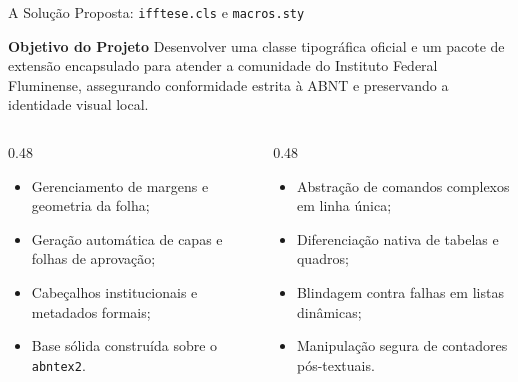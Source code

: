 \documentclass[aspectratio=169, 10pt]{beamer}
\begin{document}
\begin{frame}{A Solução Proposta: \texttt{ifftese.cls} e \texttt{macros.sty}}
  \begin{block}{\textbf{Objetivo do Projeto}}
    Desenvolver uma classe tipográfica oficial e um pacote de extensão encapsulado para atender a comunidade do Instituto Federal Fluminense, assegurando conformidade estrita à ABNT e preservando a identidade visual local.
  \end{block}

  \vspace{0.3cm}

  \begin{columns}[T]
    \begin{column}{0.48\textwidth}
      \begin{tcolorbox}[colback=white,colframe=iffgreen,title=\textbf{Classe \texttt{ifftese.cls}}]
        \small
        \begin{itemize}
          \item Gerenciamento de margens e geometria da folha;
          \item Geração automática de capas e folhas de aprovação;
          \item Cabeçalhos institucionais e metadados formais;
          \item Base sólida construída sobre o \texttt{abntex2}.
        \end{itemize}
      \end{tcolorbox}
    \end{column}

    \begin{column}{0.48\textwidth}
      \begin{tcolorbox}[colback=white,colframe=conepeteal,title=\textbf{Extensão \texttt{macros.sty}}]
        \small
        \begin{itemize}
          \item Abstração de comandos complexos em linha única;
          \item Diferenciação nativa de tabelas e quadros;
          \item Blindagem contra falhas em listas dinâmicas;
          \item Manipulação segura de contadores pós-textuais.
        \end{itemize}
      \end{tcolorbox}
    \end{column}
  \end{columns}
\end{frame}
\end{document}
